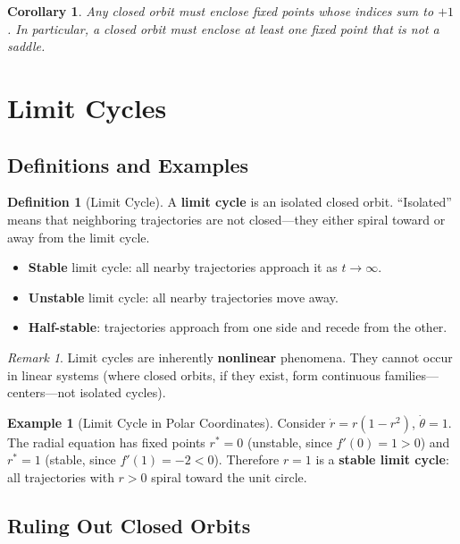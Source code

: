 \documentclass[11pt,letterpaper]{article}
\theoremstyle{definition}
\newtheorem{definition}{Definition}[section]
\newtheorem{example}{Example}[section]
\theoremstyle{plain}
\newtheorem{corollary}[theorem]{Corollary}
\theoremstyle{remark}
\newtheorem{remark}{Remark}[section]
\begin{document}
\begin{corollary}
Any closed orbit must enclose fixed points whose indices sum to $+1$.
In particular, a closed orbit must enclose at least one fixed point that
is not a saddle.
\end{corollary}


\section{Limit Cycles}\label{sec:limit-cycles}

\subsection{Definitions and Examples}

\begin{definition}[Limit Cycle]
A \textbf{limit cycle} is an isolated closed orbit.  ``Isolated'' means
that neighboring trajectories are not closed---they either spiral toward or
away from the limit cycle.
\begin{itemize}[leftmargin=2em]
\item \textbf{Stable} limit cycle: all nearby trajectories approach it as
      $t\to\infty$.
\item \textbf{Unstable} limit cycle: all nearby trajectories move away.
\item \textbf{Half-stable}: trajectories approach from one side and recede
      from the other.
\end{itemize}
\end{definition}

\begin{remark}
Limit cycles are inherently \textbf{nonlinear} phenomena.  They cannot
occur in linear systems (where closed orbits, if they exist, form
continuous families---centers---not isolated cycles).
\end{remark}

\begin{example}[Limit Cycle in Polar Coordinates]
Consider $\dot{r} = r(1-r^2)$, $\dot{\theta} = 1$.
The radial equation has fixed points $r^*=0$ (unstable, since
$f'(0)=1>0$) and $r^*=1$ (stable, since $f'(1)=-2<0$).  Therefore
$r=1$ is a \textbf{stable limit cycle}: all trajectories with $r>0$
spiral toward the unit circle.
\end{example}

\subsection{Ruling Out Closed Orbits}
\end{document}
